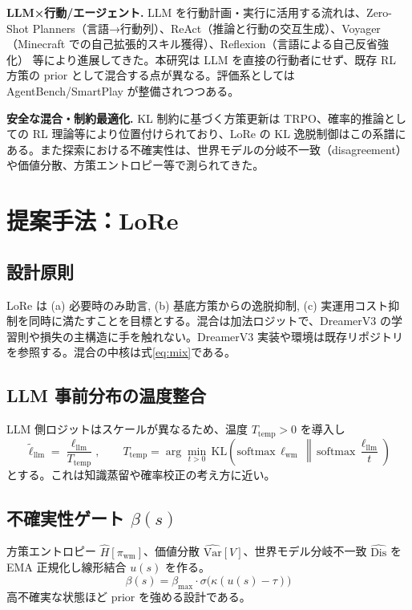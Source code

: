 \documentclass[a4paper,12pt]{article}
\begin{document}
\textbf{LLM×行動/エージェント.} LLM を行動計画・実行に活用する流れは、Zero-Shot Planners（言語→行動列）\citep{huang2022lmp,huang2022pmlr}、ReAct（推論と行動の交互生成）\citep{yao2023react}、Voyager（Minecraft での自己拡張的スキル獲得）\citep{wang2023voyager}、Reflexion（言語による自己反省強化）\citep{shinn2023reflexion} 等により進展してきた。本研究は LLM を直接の行動者にせず、既存 RL 方策の prior として混合する点が異なる。評価系としては AgentBench/SmartPlay が整備されつつある\citep{liu2023agentbench,wu2023smartplay}。

\textbf{安全な混合・制約最適化.} KL 制約に基づく方策更新は TRPO、確率的推論としての RL 理論等により位置付けられており、LoRe の KL 逸脱制御はこの系譜にある\citep{schulman2015trpo,levine2018rlcontrol}。また探索における不確実性は、世界モデルの分岐不一致（disagreement）や価値分散、方策エントロピー等で測られてきた\citep{sekar2020plan2explore,pathak2019disagreement}。

\section{提案手法：LoRe}
\subsection{設計原則}
 LoRe は (a) 必要時のみ助言, (b) 基底方策からの逸脱抑制, (c) 実運用コスト抑制を同時に満たすことを目標とする。混合は加法ロジットで、DreamerV3 の学習則や損失の主構造に手を触れない。DreamerV3 実装や環境は既存リポジトリを参照する\citep{dreamerv3_github}。混合の中核は式\eqref{eq:mix}である。


\subsection{LLM 事前分布の温度整合}
LLM 側ロジットはスケールが異なるため、温度 $T_{\mathrm{temp}}>0$ を導入し
\begin{equation}\label{eq:temp}
\tilde{\ell}_{\mathrm{llm}}=\frac{\ell_{\mathrm{llm}}}{T_{\mathrm{temp}}},\qquad T_{\mathrm{temp}}=\arg\min_{t>0}\,\mathrm{KL}\!\left(\mathrm{softmax}\,\ell_{\mathrm{wm}}\,\middle\|\,\mathrm{softmax}\,\frac{\ell_{\mathrm{llm}}}{t}\right)
\end{equation}
とする。これは知識蒸留や確率校正の考え方に近い\citep{hinton2015distill,guo2017calibration}。

\subsection{不確実性ゲート $\beta(s)$}
方策エントロピー $\hat H[\pi_{\mathrm{wm}}]$、価値分散 $\widehat{\mathrm{Var}}[V]$、世界モデル分岐不一致 $\widehat{\mathrm{Dis}}$ を EMA 正規化し線形結合 $u(s)$ を作る。
\begin{equation}\label{eq:beta}
\beta(s)=\beta_{\max}\cdot \sigma\!\bigl(\kappa(u(s)-\tau)\bigr)
\end{equation}
高不確実な状態ほど prior を強める設計である\citep{sekar2020plan2explore,pathak2019disagreement}。
\end{document}
